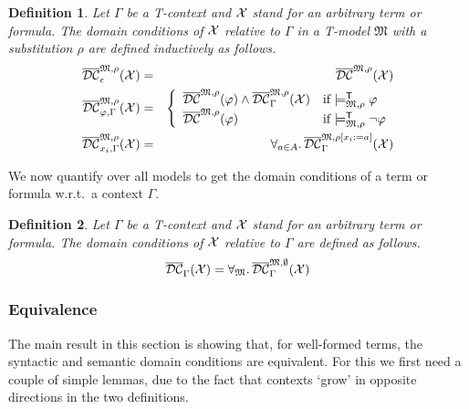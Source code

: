 \documentclass{article}
\newtheorem{definition}{Definition}[section]
\newcommand{\T}{\textsf T}
\newcommand{\mymodelss}[3]{\ensuremath{\models_{\mathfrak{#2},{#3}}^{\mathsf{#1}}}}
\newcommand{\semDC}[2][{\mathfrak M},\rho]{\ensuremath{\overline{\cal{DC}}^{#1}_{#2}}}
\def\sep{.\,}
\begin{document}
\begin{definition}\label{defn:semDCGamma}
Let $\Gamma$ be a {\T}-context and $\cal X$ stand for an arbitrary term
or formula.  The domain conditions of $\cal X$ relative to $\Gamma$ in
a {\T}-model $\mathfrak M$ with a substitution $\rho$ are defined
inductively as follows.
\begin{eqnarray*}
\semDC{\epsilon}({\cal X}) & = & \semDC{}({\cal X}) \\
\semDC{\varphi,\Gamma}({\cal X}) & = &
 \left\{\begin{array}{ll}
  \semDC{}(\varphi)\wedge\semDC{\Gamma}({\cal X}) &
   \mbox{if $\mymodelss{T}M\rho\varphi$}\\
  \semDC{}(\varphi) &
   \mbox{if $\mymodelss{T}M\rho\neg\varphi$}
 \end{array}\right. \\
\semDC{x_i,\Gamma}({\cal X}) & = &
 \forall_{a\in A}\sep\semDC[{\mathfrak M},{\rho[x_i:=a]}]{\Gamma}({\cal X})
\end{eqnarray*}
\end{definition}

We now quantify over all models to get the domain conditions of a term
or formula w.r.t.\ a context $\Gamma$.

\begin{definition}\label{defn:semDC}
Let $\Gamma$ be a {\T}-context and $\cal X$ stand for an arbitrary term
or formula.  The domain conditions of $\cal X$ relative to $\Gamma$ are
defined as follows.
\[
\semDC[{}]{\Gamma}({\cal X}) =
 \forall_{\mathfrak M}\sep\semDC[{\mathfrak M},\emptyset]{\Gamma}({\cal X})
\]
\end{definition}

\subsubsection*{Equivalence}

The main result in this section is showing that, for well-formed terms,
the syntactic and semantic domain conditions are equivalent.  For this
we first need a couple of simple lemmas, due to the fact that contexts
`grow' in opposite directions in the two definitions.
\end{document}
